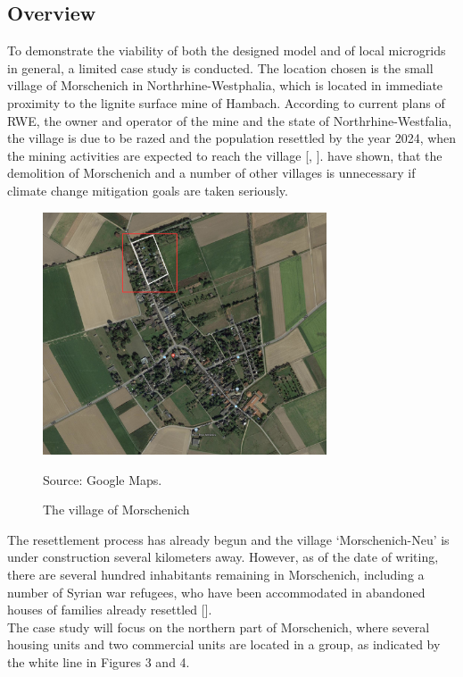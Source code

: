 \documentclass[
	11pt,								%
	DIV10,								%
	a4paper,         					%
	oneside,							%
	headheight=20pt,					%
	footheight=20pt,					%
    parskip=full,						%
    listof=totoc,						%
	bibliography=totoc,					%
	index=totoc,						%
]{scrartcl}
\begin{document}
\subsection{Overview}
To demonstrate the viability of both the designed model and of local microgrids in general, a limited case study is conducted. The location chosen is the small village of Morschenich in Northrhine-Westphalia, which is located in immediate proximity to the lignite surface mine of Hambach. According to current plans of RWE, the owner and operator of the mine and the state of Northrhine-Westfalia, the village is due to be razed and the population resettled by the year 2024, when the mining activities are expected to reach the village [\cite{RahmendatenMorschenichGemeinde2018}, \cite{UmsiedlungMorschenich}]. \cite{oeiWeichenstellungKohlekonsensKohlevorraete2019} have shown, that the demolition of Morschenich and a number of other villages is unnecessary if climate change mitigation goals are taken seriously.
\begin{figure}[H]
	\centering
	\includegraphics[width=0.75\textwidth]{pictures/Morschenich.png}
	\caption{The village of Morschenich}
	\label{morschenich}
	\flushleft\quad\quad\footnotesize{Source: Google Maps.}
\end{figure}
The resettlement process has already begun and the village `Morschenich-Neu' is under construction several kilometers away. However, as of the date of writing, there are several hundred inhabitants remaining in Morschenich, including a number of Syrian war refugees, who have been accommodated in abandoned houses of families already  resettled [\cite{bauerAbgrundtief2018}].
\\
The case study will focus on the northern part of Morschenich, where several housing units and two commercial units are located in a group, as indicated by the white line in Figures 3 and 4. 
\end{document}
